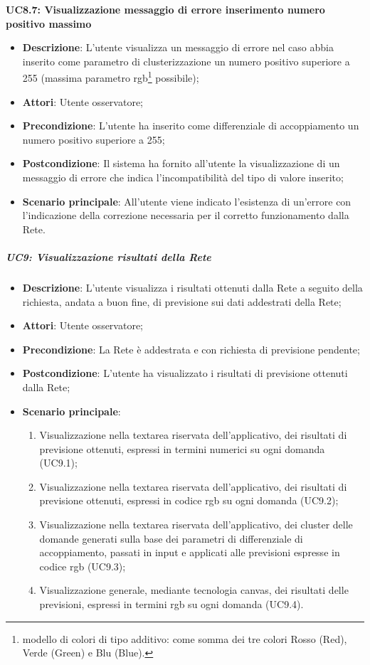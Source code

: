 \textbf{UC8.7: Visualizzazione messaggio di errore inserimento numero positivo massimo}\mbox{}
\label{UC8.7: Visualizzazione messaggio di errore per inserimento numero positivo massimo}
\noindent
\begin{itemize}
\item \textbf{Descrizione}: L'utente visualizza un messaggio di errore nel caso abbia inserito come parametro di clusterizzazione un numero positivo superiore a 255 (massima parametro rgb\footnote{modello di colori di tipo additivo: come somma dei tre colori Rosso (Red), Verde (Green) e Blu (Blue).} possibile);
\item \textbf{Attori}: Utente osservatore;
\item \textbf{Precondizione}: L'utente ha inserito come differenziale di accoppiamento un numero positivo superiore a 255;
\item \textbf{Postcondizione}: Il sistema ha fornito all'utente la visualizzazione di un messaggio di errore che indica  l'incompatibilit\`a del tipo di valore inserito;
\item \textbf{Scenario principale}: All'utente viene indicato l'esistenza di un'errore con l'indicazione della correzione necessaria per il corretto funzionamento dalla Rete.
\end{itemize}

\subparagraph{UC9: Visualizzazione risultati della Rete}\mbox{}
\label{UC9: Visualizzazione risultati della Rete}
\noindent
\begin{itemize}
\item \textbf{Descrizione}: L'utente visualizza i risultati ottenuti dalla Rete a seguito della richiesta, andata a buon fine, di previsione sui dati addestrati della Rete;
\item \textbf{Attori}: Utente osservatore;
\item \textbf{Precondizione}: La Rete \`e addestrata e con richiesta di previsione pendente;
\item \textbf{Postcondizione}: L'utente ha visualizzato i risultati di previsione ottenuti dalla Rete; 
\item \textbf{Scenario principale}:
\begin{enumerate}
\item Visualizzazione nella textarea riservata dell'applicativo, dei risultati di previsione ottenuti, espressi in termini numerici su ogni domanda (UC9.1);
\item Visualizzazione nella textarea riservata dell'applicativo, dei risultati di previsione ottenuti, espressi in codice rgb su ogni domanda (UC9.2);
\item Visualizzazione nella textarea riservata dell'applicativo, dei cluster delle domande generati sulla base dei parametri di differenziale di accoppiamento, passati in input e applicati alle previsioni espresse in codice rgb (UC9.3);
\item Visualizzazione generale, mediante tecnologia canvas, dei risultati delle previsioni, espressi in termini rgb su ogni domanda (UC9.4).
\end{enumerate}
\end{itemize}

